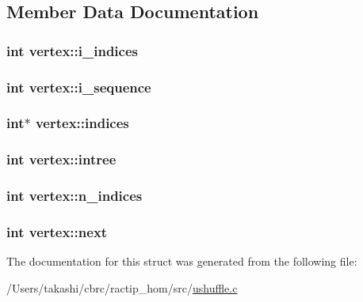 \subsection{Member Data Documentation}
\hypertarget{structvertex_a7428afcc864f983bc3f0542657362f30}{
\subsubsection[{i\+\_\+indices}]{\setlength{\rightskip}{0pt plus 5cm}int vertex\+::i\+\_\+indices}}\label{structvertex_a7428afcc864f983bc3f0542657362f30}
\hypertarget{structvertex_a1d2a65f07fe0575909c18bf445a7a4c1}{
\subsubsection[{i\+\_\+sequence}]{\setlength{\rightskip}{0pt plus 5cm}int vertex\+::i\+\_\+sequence}}\label{structvertex_a1d2a65f07fe0575909c18bf445a7a4c1}
\hypertarget{structvertex_a583999f36a31b761343555543e2eefce}{
\subsubsection[{indices}]{\setlength{\rightskip}{0pt plus 5cm}int$\ast$ vertex\+::indices}}\label{structvertex_a583999f36a31b761343555543e2eefce}
\hypertarget{structvertex_ade015e1a35c3260e139ff7b4e5d4933d}{
\subsubsection[{intree}]{\setlength{\rightskip}{0pt plus 5cm}int vertex\+::intree}}\label{structvertex_ade015e1a35c3260e139ff7b4e5d4933d}
\hypertarget{structvertex_a296df49f6cab00157977d610f7dbae5b}{
\subsubsection[{n\+\_\+indices}]{\setlength{\rightskip}{0pt plus 5cm}int vertex\+::n\+\_\+indices}}\label{structvertex_a296df49f6cab00157977d610f7dbae5b}
\hypertarget{structvertex_ac67d53f1ccda0ec85b4870127b6928ad}{
\subsubsection[{next}]{\setlength{\rightskip}{0pt plus 5cm}int vertex\+::next}}\label{structvertex_ac67d53f1ccda0ec85b4870127b6928ad}


The documentation for this struct was generated from the following file\+:\begin{DoxyCompactItemize}
\item 
/\+Users/takashi/cbrc/ractip\+\_\+hom/src/\hyperlink{ushuffle_8c}{ushuffle.\+c}\end{DoxyCompactItemize}
